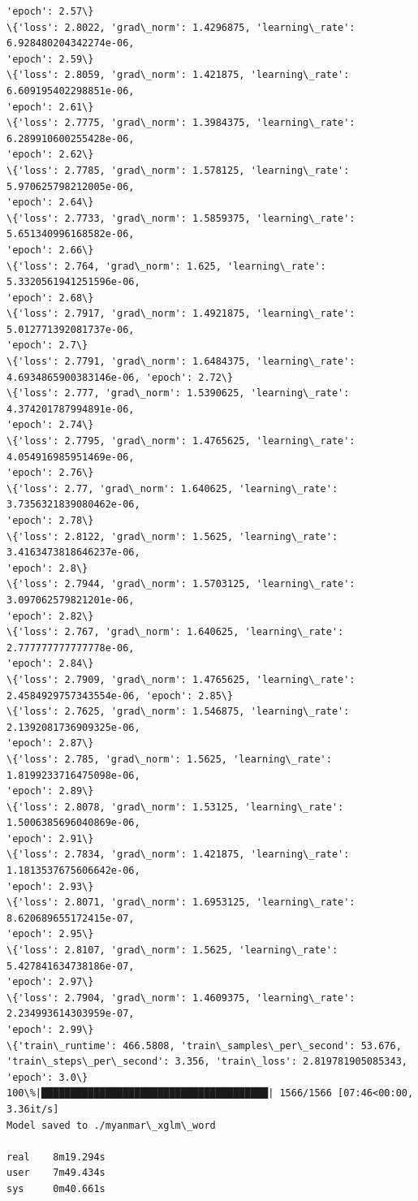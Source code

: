 \documentclass[11pt]{article}
\begin{document}
\begin{Verbatim}[commandchars=\\\{\}]
'epoch': 2.57\}
\{'loss': 2.8022, 'grad\_norm': 1.4296875, 'learning\_rate': 6.928480204342274e-06,
'epoch': 2.59\}
\{'loss': 2.8059, 'grad\_norm': 1.421875, 'learning\_rate': 6.609195402298851e-06,
'epoch': 2.61\}
\{'loss': 2.7775, 'grad\_norm': 1.3984375, 'learning\_rate': 6.289910600255428e-06,
'epoch': 2.62\}
\{'loss': 2.7785, 'grad\_norm': 1.578125, 'learning\_rate': 5.970625798212005e-06,
'epoch': 2.64\}
\{'loss': 2.7733, 'grad\_norm': 1.5859375, 'learning\_rate': 5.651340996168582e-06,
'epoch': 2.66\}
\{'loss': 2.764, 'grad\_norm': 1.625, 'learning\_rate': 5.3320561941251596e-06,
'epoch': 2.68\}
\{'loss': 2.7917, 'grad\_norm': 1.4921875, 'learning\_rate': 5.012771392081737e-06,
'epoch': 2.7\}
\{'loss': 2.7791, 'grad\_norm': 1.6484375, 'learning\_rate':
4.6934865900383146e-06, 'epoch': 2.72\}
\{'loss': 2.777, 'grad\_norm': 1.5390625, 'learning\_rate': 4.374201787994891e-06,
'epoch': 2.74\}
\{'loss': 2.7795, 'grad\_norm': 1.4765625, 'learning\_rate': 4.054916985951469e-06,
'epoch': 2.76\}
\{'loss': 2.77, 'grad\_norm': 1.640625, 'learning\_rate': 3.7356321839080462e-06,
'epoch': 2.78\}
\{'loss': 2.8122, 'grad\_norm': 1.5625, 'learning\_rate': 3.4163473818646237e-06,
'epoch': 2.8\}
\{'loss': 2.7944, 'grad\_norm': 1.5703125, 'learning\_rate': 3.097062579821201e-06,
'epoch': 2.82\}
\{'loss': 2.767, 'grad\_norm': 1.640625, 'learning\_rate': 2.777777777777778e-06,
'epoch': 2.84\}
\{'loss': 2.7909, 'grad\_norm': 1.4765625, 'learning\_rate':
2.4584929757343554e-06, 'epoch': 2.85\}
\{'loss': 2.7625, 'grad\_norm': 1.546875, 'learning\_rate': 2.1392081736909325e-06,
'epoch': 2.87\}
\{'loss': 2.785, 'grad\_norm': 1.5625, 'learning\_rate': 1.8199233716475098e-06,
'epoch': 2.89\}
\{'loss': 2.8078, 'grad\_norm': 1.53125, 'learning\_rate': 1.5006385696040869e-06,
'epoch': 2.91\}
\{'loss': 2.7834, 'grad\_norm': 1.421875, 'learning\_rate': 1.1813537675606642e-06,
'epoch': 2.93\}
\{'loss': 2.8071, 'grad\_norm': 1.6953125, 'learning\_rate': 8.620689655172415e-07,
'epoch': 2.95\}
\{'loss': 2.8107, 'grad\_norm': 1.5625, 'learning\_rate': 5.427841634738186e-07,
'epoch': 2.97\}
\{'loss': 2.7904, 'grad\_norm': 1.4609375, 'learning\_rate': 2.234993614303959e-07,
'epoch': 2.99\}
\{'train\_runtime': 466.5808, 'train\_samples\_per\_second': 53.676,
'train\_steps\_per\_second': 3.356, 'train\_loss': 2.819781905085343, 'epoch': 3.0\}
100\%|███████████████████████████████████████| 1566/1566 [07:46<00:00,  3.36it/s]
Model saved to ./myanmar\_xglm\_word

real    8m19.294s
user    7m49.434s
sys     0m40.661s
    \end{Verbatim}
\end{document}

